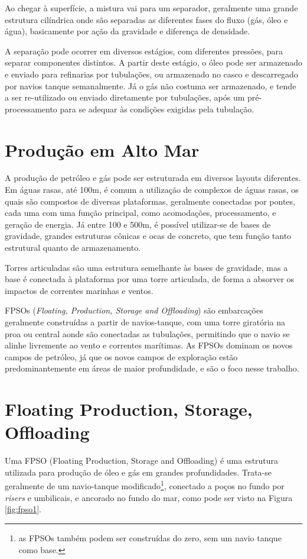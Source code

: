 Ao chegar à superfície, a mistura vai para um separador, geralmente uma grande estrutura cilíndrica onde são separadas as diferentes fases do fluxo (gás, óleo e água), basicamente por ação da gravidade e diferença de densidade.
%


A separação pode ocorrer em diversos estágios, com diferentes pressões, para separar componentes distintos.
%
A partir deste estágio, o óleo pode ser armazenado e enviado para refinarias por tubulações, ou armazenado no casco e descarregado por navios tanque semanalmente.
%
Já o gás não costuma ser armazenado, e tende a ser re-utilizado ou enviado diretamente por tubulações, após um pré-processamento para se adequar às condições exigidas pela tubulação.
%

\section{Produção em Alto Mar}

A produção de petróleo e gás pode ser estruturada em diversos layouts diferentes.
% 
Em águas rasas, até 100m, é comum a utilização de complexos de águas rasas, os quais são compostos de diversas plataformas, geralmente conectadas por pontes, cada uma com uma função principal, como acomodações, processamento, e geração de energia.
%
Já entre 100 e 500m, é possível utilizar-se de bases de gravidade, grandes estruturas cônicas e ocas de concreto, que tem função tanto estrutural quanto de armazenamento. 
%

Torres articuladas são uma estrutura semelhante às bases de gravidade, mas a base é conectada à plataforma por uma torre articulada, de forma a absorver os impactos de correntes marinhas e ventos.
%

FPSOs (\textit{Floating, Production, Storage and Offloading}) são embarcações geralmente construídas a partir de navios-tanque, com uma torre giratória na proa ou central aonde são conectadas as tubulações, permitindo que o navio se alinhe livremente ao vento e correntes marítimas. 
%
As FPSOs dominam os novos campos de petróleo, já que os novos campos de exploração estão predominantemente em áreas de maior profundidade, e são o foco nesse trabalho.

\section{Floating Production, Storage, Offloading}
Uma FPSO (Floating Production, Storage and Offloading) é uma estrutura utilizada para produção de óleo e gás em grandes profundidades. Trata-se geralmente de um navio-tanque modificado\footnote{as FPSOs também podem ser construídas do zero, sem um navio tanque como base.}, conectado a poços no fundo por \textit{risers} e umbilicais, e ancorado no fundo do mar, como pode ser visto na Figura \ref{fig:fpso1}.


